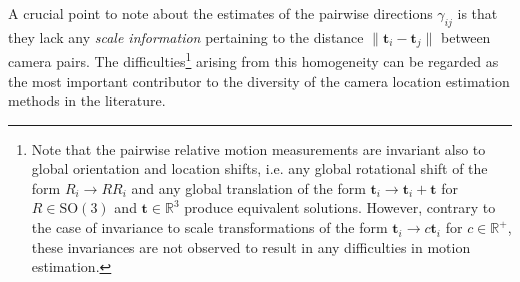 \documentclass[10pt]{article}
\newcommand{\R}{\ensuremath{\mathbb{R}}}
\begin{document}
A crucial point to note about the estimates of the pairwise directions $\gamma_{ij}$ is that they lack any \textit{scale information} pertaining to the distance $\|\mathbf{t}_i-\mathbf{t}_j\|$ between camera pairs. The difficulties\footnote{Note that the pairwise relative motion measurements are invariant also to global orientation and location shifts, i.e. any global rotational shift of the form $R_i\rightarrow RR_i$ and any global translation of the form $\mathbf{t}_i\rightarrow\mathbf{t}_i + \mathbf{t}$ for $R\in\mbox{SO}(3)$ and $\mathbf{t}\in\R^3$ produce equivalent solutions. However, contrary to the case of invariance to scale transformations of the form $\mathbf{t}_i\rightarrow c\mathbf{t}_i$ for $c\in\R^+$, these invariances are not observed to result in any difficulties in motion estimation.} arising from this homogeneity can be regarded as the most important contributor to the diversity of the camera location estimation methods in the literature.
\end{document}
